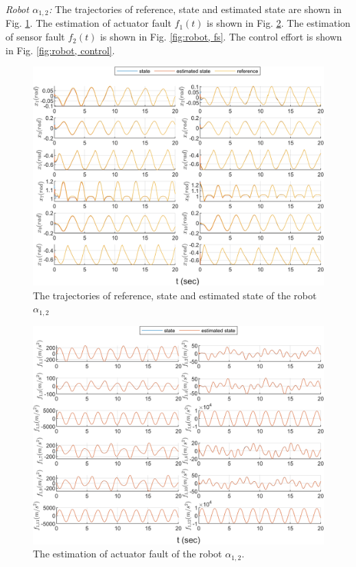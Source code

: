 \documentclass{ieeeaccess}
\begin{document}
\textit{Robot $\alpha_{1,2}$:}
The trajectories of reference, state and estimated state are shown in Fig. \ref{fig:robot, state}. The estimation of actuator fault $f_1(t)$ is shown in Fig. \ref{fig:robot, fa}. The estimation of sensor fault $f_2(t)$ is shown in Fig. \ref{fig:robot, fs}. The control effort is shown in Fig. \ref{fig:robot, control}.
\begin{figure}[htbp]
    \centering
    \includegraphics[scale=.57]{fig/robot (1).png}\caption{The trajectories of reference, state and estimated state of the robot $\alpha_{1,2}$}%
    \label{fig:robot, state}
\end{figure}
\begin{figure}[htbp]
    \centering
    \includegraphics[scale=.57]{fig/robot (2).png}\caption{The estimation of actuator fault of the robot $\alpha_{1,2}$.}%
    \label{fig:robot, fa}
\end{figure}
\end{document}
